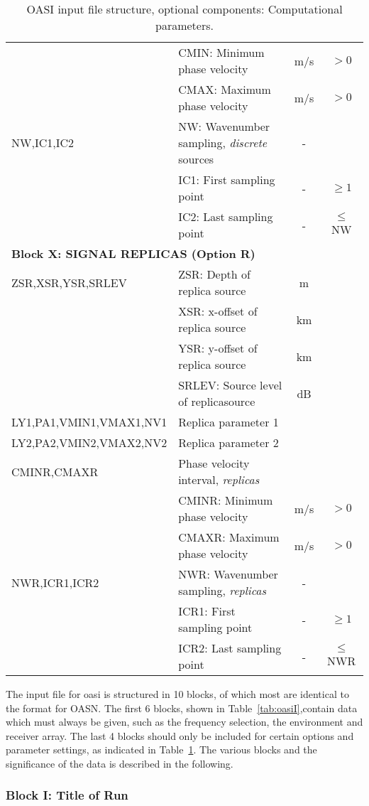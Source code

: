 \begin{table}
\begin{center}
\begin{tabular}{|l|l|c|c|}
	& CMIN: Minimum phase velocity & m/s & $>0$ \\
	& CMAX: Maximum phase velocity & m/s & $>0$ \\
NW,IC1,IC2 & NW: Wavenumber sampling, {\em discrete} sources & - &   \\
	& IC1: First sampling point & - & $\geq 1$ \\
	& IC2: Last sampling point & - & $\leq$NW \\
\hline
\multicolumn{4}{|l|}{\bf Block X: SIGNAL REPLICAS (Option R)}  \\ 
\hline
ZSR,XSR,YSR,SRLEV & ZSR: Depth of replica source & m & \\
	& XSR: x-offset of replica source & km & \\ 
	& YSR: y-offset of replica source & km & \\
	& SRLEV: Source level of replicasource & dB & \\
LY1,PA1,VMIN1,VMAX1,NV1 & Replica parameter 1  &  & \\ 
LY2,PA2,VMIN2,VMAX2,NV2 & Replica parameter 2  &  & \\ 
CMINR,CMAXR & Phase velocity interval, {\em replicas} & & \\ 
	& CMINR: Minimum phase velocity & m/s & $>0$ \\
	& CMAXR: Maximum phase velocity & m/s & $>0$ \\
NWR,ICR1,ICR2 & NWR: Wavenumber sampling, {\em replicas} & - &   \\
	& ICR1: First sampling point & - & $\geq 1$ \\
	& ICR2: Last sampling point & - & $\leq$NWR \\
\hline
\end{tabular}
\end{center}
\caption{OASI input file structure, optional components: 
Computational parameters.
 \label{tab:oasiII} }
\end{table} 

The input file for oasi is structured in 10 blocks, of which most are
identical to the format for OASN. The first 6 blocks,
shown in Table~\ref{tab:oasiI},contain data which must always
be given, such as the  frequency selection, the environment and
receiver array. The last 4 blocks
should only be included for certain options and parameter settings, as
indicated in Table~\ref{tab:oasiII}. The various blocks and the
significance of the data is described in the following.

\subsubsection{Block I: Title of Run}

